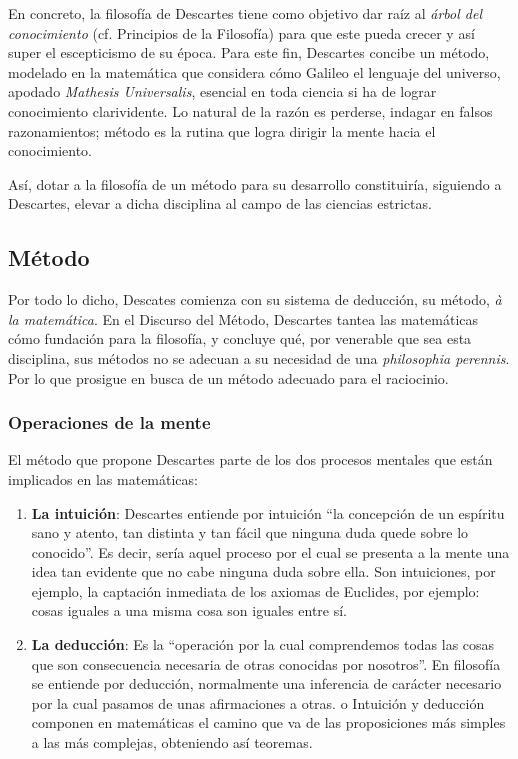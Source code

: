 \documentclass[10pt]{article}
\begin{document}
En concreto, la filosofía de Descartes tiene como objetivo dar raíz al \textit{árbol del conocimiento} (cf. Principios de la Filosofía) para que este pueda crecer y así
super el escepticismo de su época. Para este fin, Descartes concibe un método, modelado en la matemática que considera cómo Galileo el lenguaje del universo, apodado \textit{Mathesis
Universalis}, esencial en toda ciencia si ha de lograr conocimiento clarividente. Lo natural de la razón es perderse, indagar en falsos razonamientos; método es la rutina que logra 
dirigir la mente hacia el conocimiento.

Así, dotar a la filosofía de un método para su desarrollo constituiría, siguiendo a Descartes, elevar a dicha disciplina al campo de las ciencias estrictas.

\subsection{Método}

Por todo lo dicho, Descates comienza con su sistema de deducción, su método, \textit{à la matemática}. En el Discurso del Método, Descartes tantea las matemáticas cómo
fundación para la filosofía, y concluye qué, por venerable que sea esta disciplina, sus métodos no se adecuan a su necesidad de una \textit{philosophia perennis}. Por lo que
prosigue en busca de un método adecuado para el raciocinio.

\subsubsection{Operaciones de la mente}

El método que propone Descartes parte de los dos procesos mentales que están implicados en las matemáticas: 
\begin{enumerate}
  \item \textbf{La intuición}: Descartes entiende por intuición ``la concepción de un espíritu sano y atento, tan distinta y tan fácil que ninguna duda quede sobre lo
    conocido''. Es decir, sería aquel proceso por el cual se presenta a la mente una idea tan evidente que no cabe ninguna duda sobre ella. Son intuiciones, por ejemplo,
    la captación inmediata de los axiomas de Euclides, por ejemplo: cosas iguales a una misma cosa son iguales entre sí. 
  \item \textbf{La deducción}: Es la “operación por la cual comprendemos todas las cosas que son consecuencia necesaria de otras conocidas por nosotros”. En filosofía se
    entiende por deducción, normalmente una inferencia de carácter necesario por la cual pasamos de unas afirmaciones a otras. o Intuición y deducción componen en 
    matemáticas el camino que va de las proposiciones más simples a las más complejas, obteniendo así teoremas.
\end{enumerate} 
\end{document}
